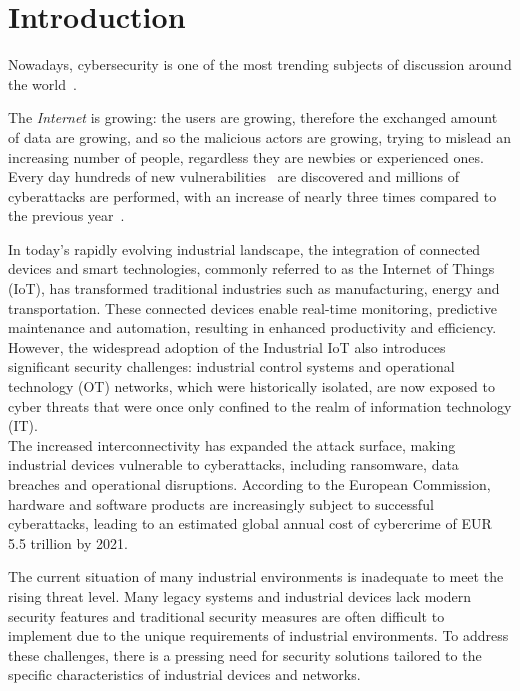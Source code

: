 \chapter{Introduction}
\label{cha:intro}

Nowadays, cybersecurity is one of the most trending subjects of discussion around the world~\cite{trends-computer-science}.

The \textit{Internet} is growing: the users are growing, therefore the exchanged amount of data are growing, and so the malicious actors are growing, trying to mislead an increasing number of people, regardless they are newbies or experienced ones. Every day hundreds of new vulnerabilities~\cite{cve-details-db} are discovered and millions of cyberattacks are performed, with an increase of nearly three times compared to the previous year~\cite{cybersecurity-attacks}.

In today's rapidly evolving industrial landscape, the integration of connected devices and smart technologies, commonly referred to as the Internet of Things (IoT), has transformed traditional industries such as manufacturing, energy and transportation. These connected devices enable real-time monitoring, predictive maintenance and automation, resulting in enhanced productivity and efficiency. \\
However, the widespread adoption of the Industrial IoT also introduces significant security challenges: industrial control systems and operational technology (OT) networks, which were historically isolated, are now exposed to cyber threats that were once only confined to the realm of information technology (IT). \\
The increased interconnectivity has expanded the attack surface, making industrial devices vulnerable to cyberattacks, including ransomware, data breaches and operational disruptions. According to the European Commission, hardware and software products are increasingly subject to successful cyberattacks, leading to an estimated global annual cost of cybercrime of EUR 5.5 trillion by 2021.~\cite{cra-eu}

The current situation of many industrial environments is inadequate to meet the rising threat level. Many legacy systems and industrial devices lack modern security features and traditional security measures are often difficult to implement due to the unique requirements of industrial environments. To address these challenges, there is a pressing need for security solutions tailored to the specific characteristics of industrial devices and networks.

